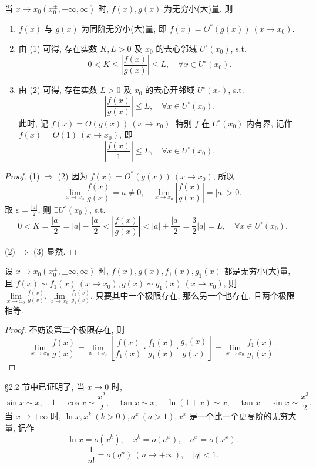 \begin{theorem}\label{thm:2.3.1}
当 $x \to x_0(x_0^{\pm}, \pm\infty, \infty)$ 时, $f(x), g(x)$ 为无穷小(大)量. 则
\begin{enumerate}[label=(\arabic*)]
  \item $f(x)$ 与 $g(x)$ 为同阶无穷小(大)量, 即 $f(x) = O^*(g(x))\ (x \to x_0)$.
  \item 由 (1) 可得, 存在实数 $K, L > 0$ 及 $x_0$ 的去心邻域 $U^\circ(x_0)$, s.t.
  \[
  0 < K \leqslant \left|\frac{f(x)}{g(x)}\right| \leqslant L,\quad \forall x \in U^\circ(x_0).
\]
  \item 由 (2) 可得, 存在实数 $L > 0$ 及 $x_0$ 的去心开邻域 $U^\circ(x_0)$, s.t.
  \[
  \left|\frac{f(x)}{g(x)}\right| \leqslant L,\quad \forall x \in U^\circ(x_0).
\]
  此时, 记 $f(x) = O(g(x))\ (x \to x_0)$. 特别 $f$ 在 $U^\circ(x_0)$ 内有界, 记作 $f(x) = O(1)\ (x \to x_0)$, 即
  \[
  \left|\frac{f(x)}{1}\right| \leqslant L,\quad \forall x \in U^\circ(x_0).
\]
\end{enumerate}
\end{theorem}

\begin{proof}
(1) $\Rightarrow$ (2) 因为 $f(x) = O^*(g(x))\ (x \to x_0)$, 所以
\[
\lim_{x\to x_0}\frac{f(x)}{g(x)} = a \neq 0,\quad \lim_{x\to x_0}\left|\frac{f(x)}{g(x)}\right| = |a| > 0.
\]
取 $\varepsilon = \frac{|a|}{2}$, 则 $\exists U^\circ(x_0)$, s.t.
\[
0 < K = \frac{|a|}{2} = |a| - \frac{|a|}{2} < \left|\frac{f(x)}{g(x)}\right| < |a| + \frac{|a|}{2} = \frac{3}{2}|a| = L,\quad \forall x \in U^\circ(x_0).
\]

(2) $\Rightarrow$ (3) 显然.
\end{proof}

\begin{theorem}[等价代换]\label{thm:2.3.2}
设 $x \to x_0(x_0^{\pm}, \pm\infty, \infty)$ 时, $f(x), g(x), f_1(x), g_1(x)$ 都是无穷小(大)量, 且 $f(x) \sim f_1(x)\ (x \to x_0), g(x) \sim g_1(x)\ (x \to x_0)$, 则 $\lim\limits_{x\to x_0}\frac{f(x)}{g(x)}, \lim\limits_{x\to x_0}\frac{f_1(x)}{g_1(x)}$, 只要其中一个极限存在, 那么另一个也存在, 且两个极限相等.
\end{theorem}

\begin{proof}
不妨设第二个极限存在, 则
\[
\lim_{x\to x_0}\frac{f(x)}{g(x)} = \lim_{x\to x_0}\left[\frac{f(x)}{f_1(x)}\cdot\frac{f_1(x)}{g_1(x)}\cdot\frac{g_1(x)}{g(x)}\right] = \lim_{x\to x_0}\frac{f_1(x)}{g_1(x)}.
\]
\end{proof}

\S2.2 节中已证明了, 当 $x \to 0$ 时,
\[
\sin x \sim x,\quad 1 - \cos x \sim \frac{x^2}{2},\quad \tan x \sim x,\quad \ln(1+x) \sim x,\quad \tan x - \sin x \sim \frac{x^3}{2}.
\]
当 $x \to +\infty$ 时, $\ln x, x^k\ (k > 0), a^x\ (a > 1), x^x$ 是一个比一个更高阶的无穷大量, 记作
\[
\ln x = o(x^k),\quad x^k = o(a^x),\quad a^x = o(x^x).
\]
\[
\frac{1}{n!} = o(q^n)\ (n \to +\infty),\quad |q| < 1.
\]

